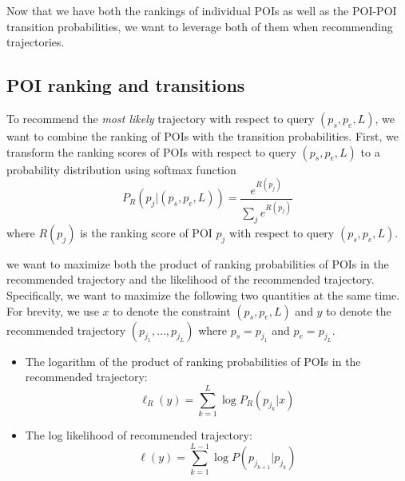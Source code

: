Now that we have both the rankings of individual POIs as well as
the POI-POI transition probabilities,
we want to leverage both of them when recommending trajectories.

\subsection{POI ranking and transitions}
To recommend the \textit{most likely} trajectory with respect to query $(p_s, p_e, L)$,
we want to combine the ranking of POIs with the transition probabilities.
First, we transform the ranking scores of POIs with respect to query $(p_s, p_e, L)$
to a probability distribution using softmax function
\begin{displaymath}
    P_R(p_j |(p_s, p_e, L)) = \frac{e^{R(p_j)}}{\sum_j e^{R(p_j)}}
\end{displaymath}
where $R(p_j)$ is the ranking score of POI $p_j$ with respect to query $(p_s, p_e, L)$.

we want to maximize both the product of ranking probabilities of POIs in the recommended trajectory and
the likelihood of the recommended trajectory.
Specifically, we want to maximize the following two quantities at the same time.
For brevity, we use $x$ to denote the constraint $(p_s, p_e, L)$ and $y$ to denote the
recommended trajectory $(p_{j_1}, \dots, p_{j_L})$ where $p_s = p_{j_1}$ and $p_e = p_{j_L}$.
\begin{itemize}
\item The logarithm of the product of ranking probabilities of POIs in the recommended trajectory:
      \begin{displaymath}
          \ell_R(y) = \sum_{k=1}^L \log P_R(p_{j_k} | x)
      \end{displaymath}
\item The log likelihood of recommended trajectory:
      \begin{displaymath}
          \ell(y) = \sum_{k=1}^{L-1} \log P(p_{j_{k+1}} | p_{j_k})
      \end{displaymath}
\end{itemize}

